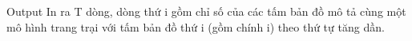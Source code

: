 Output
In ra T dòng, dòng thứ i gồm chỉ số của các tấm bản đồ mô tả cùng một mô hình trang trại với tấm bản đồ thứ i (gồm chính i) theo thứ tự tăng dần.